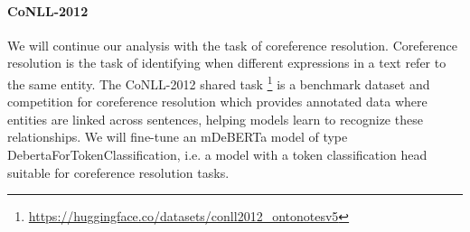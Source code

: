 \paragraph{CoNLL-2012} We will continue our analysis with the task of coreference resolution. Coreference resolution is the task of identifying when different expressions in a text refer to the same entity. The CoNLL-2012 shared task \footnote{\url{https://huggingface.co/datasets/conll2012_ontonotesv5}} is a benchmark dataset and competition for coreference resolution  which provides annotated data where entities are linked across sentences, helping models learn to recognize these relationships. We will fine-tune an mDeBERTa model of type DebertaForTokenClassification, i.e. a model with a token classification head suitable for coreference resolution tasks.

